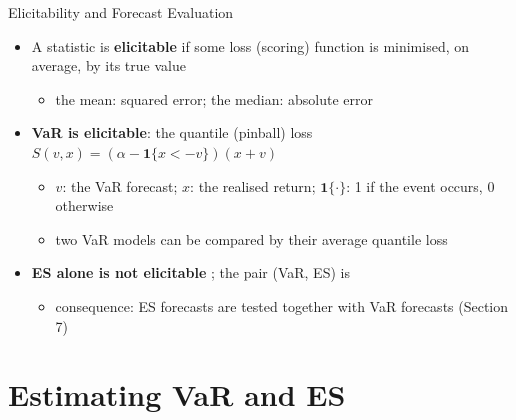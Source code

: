 \begin{frame}{Elicitability and Forecast Evaluation}
\itemsize{\small}
\begin{itemize}
    \item A statistic is \textbf{elicitable} if some loss (scoring) function is minimised, on average, by its true value 
    \begin{itemize}
        \item the mean: squared error; the median: absolute error
    \end{itemize}
    \item \textbf{VaR is elicitable}: the quantile (pinball) loss $S(v, x) = (\alpha - \mathbf{1}\{x < -v\})(x + v)$
    \begin{itemize}
        \item $v$: the VaR forecast; $x$: the realised return; $\mathbf{1}\{\cdot\}$: 1 if the event occurs, 0 otherwise
        \item two VaR models can be compared by their average quantile loss
    \end{itemize}
    \item \textbf{ES alone is not elicitable} ; the pair (VaR, ES) is 
    \begin{itemize}
        \item consequence: ES forecasts are tested together with VaR forecasts (Section 7)
    \end{itemize}
\end{itemize}
\end{frame}


\section{Estimating VaR and ES}

